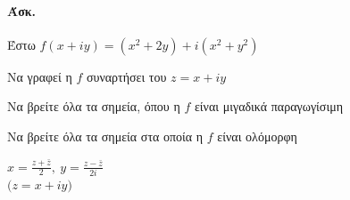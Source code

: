 \documentclass[12pt,a4paper,notitlepage,fleqn]{article}
\begin{document}
	\paragraph{Άσκ.}
	Έστω \( f(x+iy) = (x^2+2y)+i(x^2+y^2) \)
	\begin{enumroman}
		\item Να γραφεί η \( f \) συναρτήσει του \( z=x+iy \)
		\item Να βρείτε όλα τα σημεία, όπου η \( f \) είναι μιγαδικά παραγωγίσιμη
		\item Να βρείτε όλα τα σημεία στα οποία η \( f \) είναι ολόμορφη
	\end{enumroman}
	\begin{enumroman}
		\item \( x=\frac{z+\bar z}{2},\ y=\frac{z-\bar z }{2i} \) \\
		\( \big(z=x+iy\big) \)


\end{enumroman}
\end{document}
